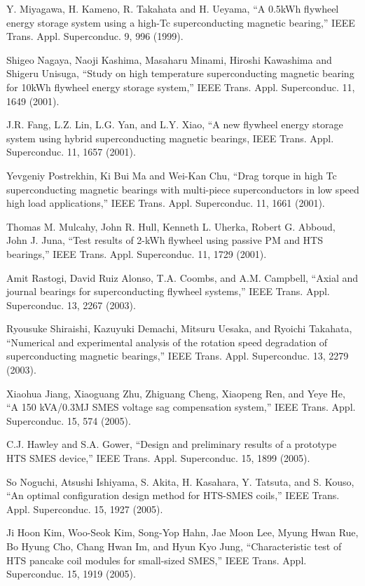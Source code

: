 \noindent [9.85] Y. Miyagawa, H. Kameno, R. Takahata and H. Ueyama, ``A 0.5kWh flywheel
energy storage system using a high-Tc superconducting magnetic bearing,” IEEE
Trans. Appl. Superconduc. 9, 996 (1999).

\noindent [9.86] Shigeo Nagaya, Naoji Kashima, Masaharu Minami, Hiroshi Kawashima and
Shigeru Unisuga, ``Study on high temperature superconducting magnetic bearing
for 10kWh flywheel energy storage system,” IEEE Trans. Appl. Superconduc.
11, 1649 (2001).

\noindent [9.87] J.R. Fang, L.Z. Lin, L.G. Yan, and L.Y. Xiao, ``A new flywheel energy storage
system using hybrid superconducting magnetic bearings, IEEE Trans. Appl. Superconduc.
11, 1657 (2001).

\noindent [9.88] Yevgeniy Postrekhin, Ki Bui Ma and Wei-Kan Chu, ``Drag torque in high Tc
superconducting magnetic bearings with multi-piece superconductors in low speed
high load applications,” IEEE Trans. Appl. Superconduc. 11, 1661 (2001).

\noindent [9.89] Thomas M. Mulcahy, John R. Hull, Kenneth L. Uherka, Robert G. Abboud, John
J. Juna, ``Test results of 2-kWh flywheel using passive PM and HTS bearings,”
IEEE Trans. Appl. Superconduc. 11, 1729 (2001).

\noindent [9.90] Amit Rastogi, David Ruiz Alonso, T.A. Coombs, and A.M. Campbell, ``Axial and
journal bearings for superconducting flywheel systems,” IEEE Trans. Appl. Superconduc. 13, 2267 (2003).

\noindent [9.91] Ryousuke Shiraishi, Kazuyuki Demachi, Mitsuru Uesaka, and Ryoichi Takahata,
``Numerical and experimental analysis of the rotation speed degradation of superconducting
magnetic bearings,” IEEE Trans. Appl. Superconduc. 13, 2279 (2003).

\noindent [9.92] Xiaohua Jiang, Xiaoguang Zhu, Zhiguang Cheng, Xiaopeng Ren, and Yeye He,
``A 150 kVA/0.3MJ SMES voltage sag compensation system,” IEEE Trans. Appl.
Superconduc. 15, 574 (2005).

\noindent [9.93] C.J. Hawley and S.A. Gower, ``Design and preliminary results of a prototype HTS
SMES device,” IEEE Trans. Appl. Superconduc. 15, 1899 (2005).

\noindent [9.94] So Noguchi, Atsushi Ishiyama, S. Akita, H. Kasahara, Y. Tatsuta, and S. Kouso,
``An optimal configuration design method for HTS-SMES coils,” IEEE Trans.
Appl. Superconduc. 15, 1927 (2005).

\noindent [9.95] Ji Hoon Kim, Woo-Seok Kim, Song-Yop Hahn, Jae Moon Lee, Myung Hwan Rue,
Bo Hyung Cho, Chang Hwan Im, and Hyun Kyo Jung, ``Characteristic test of HTS
pancake coil modules for small-sized SMES,” IEEE Trans. Appl. Superconduc.
15, 1919 (2005).

